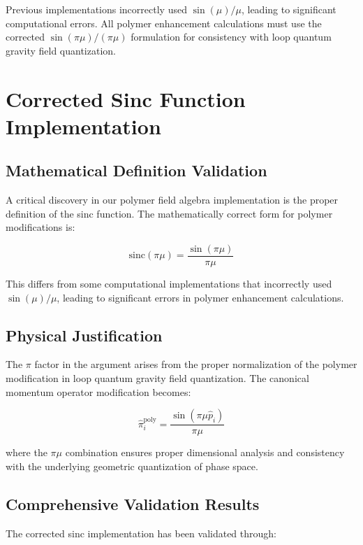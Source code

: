 \documentclass[12pt]{article}
\begin{document}
Previous implementations incorrectly used $\sin(\mu)/\mu$, leading to significant computational errors. All polymer enhancement calculations must use the corrected $\sin(\pi\mu)/(\pi\mu)$ formulation for consistency with loop quantum gravity field quantization.

\section{Corrected Sinc Function Implementation}

\subsection{Mathematical Definition Validation}

A critical discovery in our polymer field algebra implementation is the proper definition of the sinc function. The mathematically correct form for polymer modifications is:

\begin{equation}
\boxed{\mathrm{sinc}(\pi\mu) = \frac{\sin(\pi\mu)}{\pi\mu}}
\end{equation}

This differs from some computational implementations that incorrectly used $\sin(\mu)/\mu$, leading to significant errors in polymer enhancement calculations.

\subsection{Physical Justification}

The $\pi$ factor in the argument arises from the proper normalization of the polymer modification in loop quantum gravity field quantization. The canonical momentum operator modification becomes:

\begin{equation}
\hat{\pi}_i^{\text{poly}} = \frac{\sin(\pi\mu \hat{p}_i)}{\pi\mu}
\end{equation}

where the $\pi\mu$ combination ensures proper dimensional analysis and consistency with the underlying geometric quantization of phase space.

\subsection{Comprehensive Validation Results}

The corrected sinc implementation has been validated through:
\end{document}
